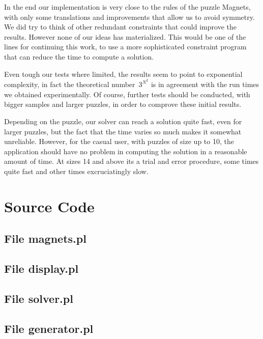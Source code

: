 \documentclass{llncs}
\begin{document}
In the end our implementation is very close to the rules of the puzzle Magnets, with only some translations and improvements that allow us to avoid symmetry. We did try to think of other redundant constraints that could improve the results. However none of our ideas has materialized. This would be one of the lines for continuing this work, to use a more sophisticated constraint program that can reduce the time to compute a solution.

Even tough our tests where limited, the results seem to point to exponential complexity, in fact the theoretical number~$3^{N^2}$ is in agreement with the run times we obtained experimentally. Of course, further tests should be conducted, with bigger samples and larger puzzles, in order to comprove these initial results.

Depending on the puzzle, our solver can reach a solution quite fast, even for larger puzzles, but the fact that the time varies so much makes it somewhat unreliable. However, for the casual user, with puzzles of size up to 10, the application should have no problem in computing the solution in a reasonable amount of time. At sizes 14 and above its a trial and error procedure, some times quite fast and other times excruciatingly slow.


\appendix
\section{Source Code}

\subsection{File magnets.pl}


\subsection{File display.pl}


\subsection{File solver.pl}


\subsection{File generator.pl}

\end{document}

